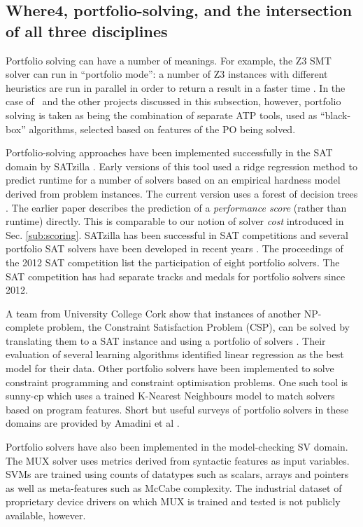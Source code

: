 \subsection{Where4, portfolio-solving, and the intersection of all three disciplines}
\label{sub:lrsvmmml}

Portfolio solving can have a number of meanings. For example, the Z3 SMT solver can run in ``portfolio mode'': a number of Z3 instances with different heuristics are run in parallel in order to return a result in a faster time \cite{WintersteigerHM09}. In the case of \where~and the other projects discussed in this subsection, however, portfolio solving is taken as being the combination of separate ATP tools, used as ``black-box'' algorithms, selected based on features of the PO being solved.

Portfolio-solving approaches have been implemented successfully in the SAT domain by SATzilla \cite{Satzilla}. Early versions of this tool used a ridge regression method to predict runtime for a number of solvers based on an empirical hardness model derived from problem instances. The current version \cite{SATzilla2012} uses a forest of decision trees . The earlier paper describes the prediction of a \textit{performance score} (rather than runtime) directly.  This is comparable to our notion of solver \textit{cost} introduced in Sec. \ref{sub:scoring}. SATzilla has been successful in SAT competitions and several portfolio SAT solvers have been developed in recent years \cite{SAT2012}.  The proceedings of the 2012 SAT competition 
list the participation of eight portfolio solvers. The SAT competition has had separate tracks and medals for portfolio solvers since 2012.  

A team from University College Cork show that instances of another NP-complete problem, the Constraint Satisfaction Problem (CSP), can be solved by translating them to a SAT instance and using a portfolio of solvers \cite{Hurley2014}. Their evaluation of several learning algorithms identified linear regression as the best model for their data.
Other portfolio solvers have been implemented to solve constraint programming and constraint optimisation problems. 
One such tool is sunny-cp \cite{sunny-cp} which uses a trained K-Nearest Neighbours model to match solvers based on program features.
Short but useful surveys of portfolio solvers in these domains are provided by Amadini et al \cite{Amadini2013, Amadini2016}.   

Portfolio solvers have also been implemented in the model-checking SV domain. The MUX \cite{MUX} solver uses metrics derived from syntactic features as input variables. SVMs are trained using counts of datatypes such as scalars, arrays and pointers as well as meta-features such as McCabe complexity. The industrial dataset of proprietary device drivers on which MUX is trained and tested is not publicly available, however.   

